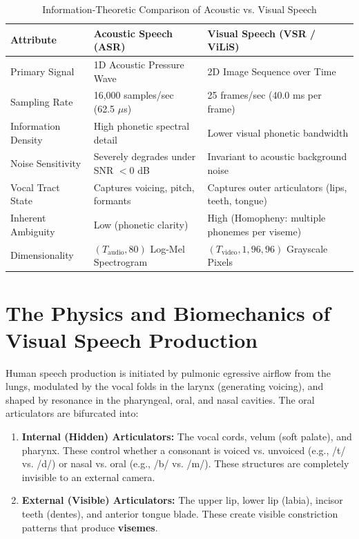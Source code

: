 \documentclass[11pt,a4paper]{report}
\begin{document}
\begin{table}[h]
\centering
\begin{tabular}{lll}
\toprule
\textbf{Attribute} & \textbf{Acoustic Speech (ASR)} & \textbf{Visual Speech (VSR / ViLiS)} \\
\midrule
Primary Signal & 1D Acoustic Pressure Wave & 2D Image Sequence over Time \\
Sampling Rate & 16,000 samples/sec (62.5 $\mu$s) & 25 frames/sec (40.0 ms per frame) \\
Information Density & High phonetic spectral detail & Lower visual phonetic bandwidth \\
Noise Sensitivity & Severely degrades under SNR $< 0$ dB & Invariant to acoustic background noise \\
Vocal Tract State & Captures voicing, pitch, formants & Captures outer articulators (lips, teeth, tongue) \\
Inherent Ambiguity & Low (phonetic clarity) & High (Homopheny: multiple phonemes per viseme) \\
Dimensionality & $(T_{\text{audio}}, 80)$ Log-Mel Spectrogram & $(T_{\text{video}}, 1, 96, 96)$ Grayscale Pixels \\
\bottomrule
\end{tabular}
\caption{Information-Theoretic Comparison of Acoustic vs. Visual Speech}
\end{table}

\section{The Physics and Biomechanics of Visual Speech Production}
Human speech production is initiated by pulmonic egressive airflow from the lungs, modulated by the vocal folds in the larynx (generating voicing), and shaped by resonance in the pharyngeal, oral, and nasal cavities. The oral articulators are bifurcated into:
\begin{enumerate}
    \item \textbf{Internal (Hidden) Articulators:} The vocal cords, velum (soft palate), and pharynx. These control whether a consonant is voiced vs. unvoiced (e.g., /t/ vs. /d/) or nasal vs. oral (e.g., /b/ vs. /m/). These structures are completely invisible to an external camera.
    \item \textbf{External (Visible) Articulators:} The upper lip, lower lip (labia), incisor teeth (dentes), and anterior tongue blade. These create visible constriction patterns that produce \textbf{visemes}.
\end{enumerate}
\end{document}
